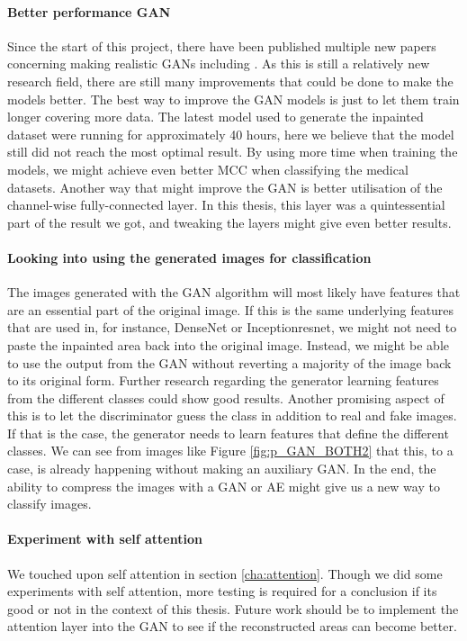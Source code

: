 \paragraph{Better performance GAN}
Since the start of this project, there have been published multiple new papers concerning making realistic GANs including \cite{DBLP:journals/corr/abs-1809-11096} \cite{DBLP:journals/corr/abs-1812-04948}. As this is still a relatively new research field, there are still many improvements that could be done to make the models better.
The best way to improve the GAN models is just to let them train longer covering more data. The latest model used to generate the inpainted dataset were running for approximately 40 hours, here we believe that the model still did not reach the most optimal result. By using more time when training the models, we might achieve even better MCC when classifying the medical datasets.
Another way that might improve the GAN is better utilisation of the channel-wise fully-connected layer. In this thesis, this layer was a quintessential part of the result we got, and tweaking the layers might give even better results.

\paragraph{Looking into using the generated images for classification}
The images generated with the GAN algorithm will most likely have features that are an essential part of the original image. If this is the same underlying features that are used in, for instance, DenseNet or Inceptionresnet, we might not need to paste the inpainted area back into the original image. Instead, we might be able to use the output from the GAN without reverting a majority of the image back to its original form.
Further research regarding the generator learning features from the different classes could show good results.
Another promising aspect of this is to let the discriminator guess the class in addition to real and fake images. If that is the case, the generator needs to learn features that define the different classes. We can see from images like Figure \ref{fig:p_GAN_BOTH2} that this, to a case, is already happening without making an auxiliary GAN.
In the end, the ability to compress the images with a GAN or AE might give us a new way to classify images.

\paragraph{Experiment with self attention}
We touched upon self attention in section \ref{cha:attention}. Though we did some experiments with self attention, more testing is required for a conclusion if its good or not in the context of this thesis. Future work should be to implement the attention layer into the GAN to see if the reconstructed areas can become better. 

